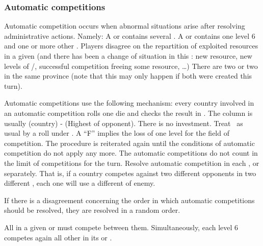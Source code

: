 \subsubsection{Automatic competitions}
\label{chAdministration:Automatic Competition}
\aparag[Conditions] Automatic competition occurs when abnormal situations
arise after resolving administrative actions. Namely:
\bparag A \STZ or \CTZ contains several \TradeFLEET\faceplus.
\bparag A \STZ or \CTZ contains one level 6 \TradeFLEET and one or more other
\TradeFLEET.
\bparag Players disagree on the repartition of exploited resources in a given
\Area (and there has been a change of situation in this \Area: new resource,
new levels of \COL/\TP, successful competition freeing some resource, \ldots)
\bparag There are two \COL or two \TP in the same province (note that this may
only happen if both were created this turn).

\aparag[Mechanism] Automatic competitions use the following mechanism: every
country involved in an automatic competition rolls one die and checks the
result in .
\bparag The column is usually (\FTI country) - (Highest \FTI of
opponent). There is no investment.
\bparag Treat \undemi\ as usual by a roll under \FTI.
\bparag A ``F'' implies the loss of one level for the field of competition.
\bparag The procedure is reiterated again until the conditions of automatic
competition do not apply any more.
\bparag The automatic competitions do not count in the limit of competitions
for the turn.
\bparag Resolve automatic competition in each \STZ, \CTZ or \Area
separately. That is, if a country competes against two different opponents in
two different \STZ, each one will use a different \FTI of enemy.

\aparag If there is a disagreement concerning the order in which automatic
competitions should be resolved, they are resolved in a random order.

\aparag[Fleets]\label{chAdministration:Trade Competition Mandatory}
All \TradeFLEET\faceplus in a given \STZ or \CTZ must compete between
them. Simultaneously, each level 6 \TradeFLEET competes again all other
\TradeFLEET in its \STZ or \CTZ.

